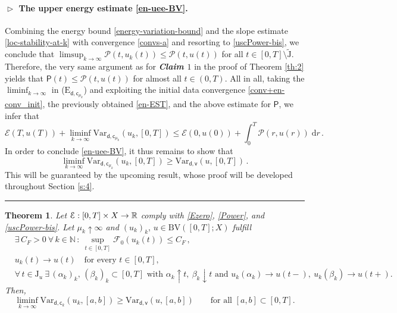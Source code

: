 \documentclass[a4paper,10pt,reqno]{amsart} %
\newcommand{\R}{\mathbb{R}}
\newcommand{\N}{\mathbb{N}}
\newtheorem{theorem}{Theorem}[section]
\numberwithin{equation}{section}
\newcommand{\up}{\uparrow}
\newcommand{\down}{\downarrow}
\newcommand{\QED}{\mbox{}\hfill\rule{5pt}{5pt}\medskip\par}
\def\dd{\;\!\mathrm{d}} %
\newcommand{\Xs}{X}
\newcommand{\BV}{\mathrm{BV}}
\newcommand{\mdn}{\mathsf{d}}
\newcommand{\ene}[2]{\mathcal{E}(#1,#2)}
\newcommand{\perto}[1]{\mathcal{F}_0(#1)}
\newcommand{\pw}[2]{\mathcal{P}(#1,#2)}
\newcommand{\Vari}[4]{\mathrm{Var}_{#1}(#2,[#3,#4])}
\newcommand{\Varapex}[5]{\mathrm{Var}_{#1}^{#2}(#3,[#4,#5])}
\newcommand{\lli}[2]{{#1}({#2}{-})}
\newcommand{\rli}[2]{{#1}({#2}{+})}
\newcommand{\jump}[1]{\mathrm{J}_{#1}}
\newcommand{\tjump}{\widetilde{\mathrm{J}}}
\newcommand{\vecostname}{\mathsf{c}}
\newcommand{\vecostnamep}[1]{\mathsf{c}_{#1}}
\newcommand{\bvcostname}{\mathsf{v}}
\newcommand{\limP}{\mathsf{P}}
\newcommand{\RRR}{\color{red}}
\begin{document}
\paragraph{\bf $\vartriangleright$ The upper energy estimate \eqref{en-uee-BV}.}  Combining the energy bound \eqref{energy-variation-bound} and
the slope estimate \eqref{loc-stability-at-k}
with convergence \eqref{convs-a} and resorting to \eqref{uscPower-bis}, we conclude that
$
\limsup_{k\to\infty} \pw t{u_{k}(t)} \leq \pw t{u(t)}
$ for all $t\in [0,T]\setminus \tjump$. Therefore, the very same argument as for  \emph{\bf Claim $1$}  in the proof of  Theorem \ref{th:2} yields that $\limP(t) \leq \pw t{u(t)}$ for almost all $t\in (0,T)$. %
All in all, taking the $\liminf_{k\to\infty}$ in  ($\mathrm{E}_{\mdn,\vecostnamep{\mu_{k}}}$)  and exploiting the initial data convergence \eqref{conv+en-conv_init}, the previously obtained  \eqref{en-EST}, and the above estimate for $\limP$,  we infer that 
\[
\ene T{u(T)} +  \liminf_{k\to\infty} \Vari{\mdn,\vecostnamep{\mu_{k}}}{u_{k}}{0}{T}\leq \ene 0{u(0)} + \int_0^T  \pw r{u(r)} \dd r\,. %
\]
In order to conclude \eqref{en-uee-BV}, 
it  thus remains to show %
that %
\[
 \liminf_{k\to\infty} \Vari{\mdn,\vecostnamep{\mu_{k}}}{u_{k}}{0}{T} \geq \Vari{\mdn,\bvcostname}{u}{0}{T}\,. %
\]
This will be guaranteed by the upcoming result, whose proof will be developed throughout Section \ref{s:4}.
\QED
\begin{theorem}
	\label{th:lsc}
Let $\calE: [0,T] \times \Xs \to \R$ comply with \eqref{Ezero},  \eqref{Power}, and  \eqref{uscPower-bis}. Let
	 $\mu_k \uparrow \infty$ and  $(u_k)_k,\, u \in \BV([0,T];\Xs)$ fulfill
	\begin{subequations}
	\label{conditions-seqs}
	\begin{align}
	&
	\label{conditions-seqs-est}
	  \exists\, C_F>0 \ \forall\, k \in \N\, : \ 
 \sup_{t\in [0,T]}\perto{u_{k}(t)} \leq C_F\,,
	 \\
	 &
	 \label{conditions-seqs-conv}
	u_k(t) \to u(t)  \quad \text{for every $t\in [0,T]$,}
	\\
	&
	\label{conditions-diag}
	 \forall\, t \in \jump u \ \exists\, (\alpha_k)_k,\, (\beta_k)_k \subset [0,T] \text{ with } \alpha_k\up t, \ \beta_k \down t \text{ and } 
	u_k(\alpha_k) \to \lli u t, \ u_k(\beta_k) \to \rli u t.
	\end{align}
			\end{subequations}
		Then,
		\begin{equation}
		\label{desired-lsc}
		\liminf_{k\to\infty} \Vari{\mdn,\vecostnamep k}{u_{k}}{a}{b} \geq \Vari{\mdn,\bvcostname}{u}{a}{b} \qquad 
		\text{for all } [a,b]\subset [0,T].
		\end{equation}	
\end{theorem}
\end{document}
